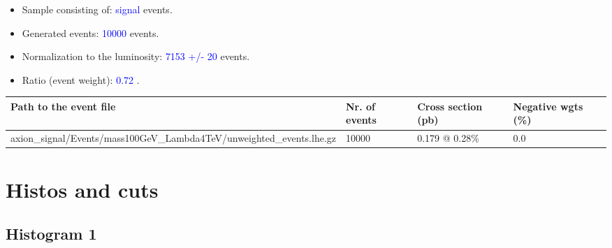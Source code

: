 \documentclass[a4paper, 10pt]{article}
\begin{document}
\begin{itemize}
  \item Sample consisting of: \textcolor{blue}{signal}  events.
   \item Generated events: \textcolor{blue}{10000 }  events.
   \item Normalization to the luminosity: \textcolor{blue}{7153}\textcolor{blue}{ +/\-- }\textcolor{blue}{20 }  events.
   \item Ratio (event weight): \textcolor{blue}{0.72 } .  
 
\end{itemize}
\begin{table}[H]
  \begin{center}
    \begin{tabular}{|m{55.0mm}|m{25.0mm}|m{30.0mm}|m{30.0mm}|}
      \hline
      {\cellcolor{yellow}         Path to the event file}& {\cellcolor{yellow}         Nr. of events}& {\cellcolor{yellow}         Cross section (pb)}& {\cellcolor{yellow}         Negative wgts (\%)}\\
      \hline
      {\cellcolor{white}          axion\_signal/\-Events/\-mass100GeV\_Lambda4TeV/\-unweighted\_events.lhe.gz}& {\cellcolor{white}          10000}& {\cellcolor{white}          0.179 @ 0.28\%}& {\cellcolor{white}          0.0}\\
\hline
    \end{tabular}
  \end{center}
\end{table}

\newpage
\section{ Histos and cuts}

\subsection{ Histogram 1}
\end{document}
